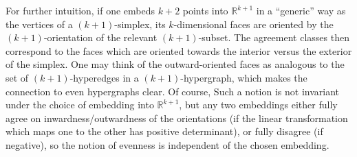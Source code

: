 \documentclass{amsart}
\def\R{\mathbb{R}}
\begin{document}
For further intuition, if one embeds $k+2$ points into $\R^{k+1}$ in a ``generic'' way as the vertices of a $(k+1)$-simplex, its $k$-dimensional faces are oriented by the $(k+1)$-orientation of the relevant $(k+1)$-subset. The agreement classes then correspond to the faces which are oriented towards the interior versus the exterior of the simplex. One may think of the outward-oriented faces as analogous to the set of $(k+1)$-hyperedges in a $(k+1)$-hypergraph, which makes the connection to even hypergraphs clear. Of course, Such a notion is not invariant under the choice of embedding into $\R^{k+1} $, but any two embeddings either fully agree on inwardness/outwardness of the orientations (if the linear transformation which maps one to the other has positive determinant), or fully disagree (if negative), so the notion of evenness is independent of the chosen embedding.
\end{document}
